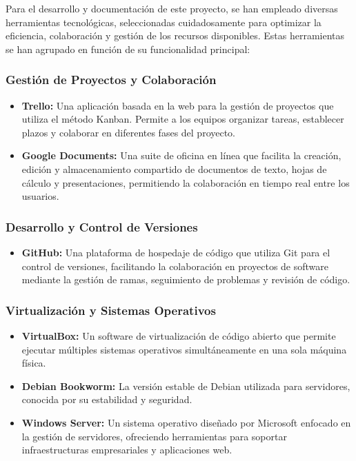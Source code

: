 
Para el desarrollo y documentación de este proyecto, se han empleado diversas herramientas tecnológicas, seleccionadas cuidadosamente para optimizar la eficiencia, colaboración y gestión de los recursos disponibles. Estas herramientas se han agrupado en función de su funcionalidad principal:

\subsubsection{Gestión de Proyectos y Colaboración}
\begin{itemize}
    \item \textbf{Trello:} Una aplicación basada en la web para la gestión de proyectos que utiliza el método Kanban. Permite a los equipos organizar tareas, establecer plazos y colaborar en diferentes fases del proyecto.
    \item \textbf{Google Documents:} Una suite de oficina en línea que facilita la creación, edición y almacenamiento compartido de documentos de texto, hojas de cálculo y presentaciones, permitiendo la colaboración en tiempo real entre los usuarios.
\end{itemize}

\subsubsection{Desarrollo y Control de Versiones}
\begin{itemize}
    \item \textbf{GitHub:} Una plataforma de hospedaje de código que utiliza Git para el control de versiones, facilitando la colaboración en proyectos de software mediante la gestión de ramas, seguimiento de problemas y revisión de código.
\end{itemize}

\subsubsection{Virtualización y Sistemas Operativos}
\begin{itemize}
    \item \textbf{VirtualBox:} Un software de virtualización de código abierto que permite ejecutar múltiples sistemas operativos simultáneamente en una sola máquina física.
    \item \textbf{Debian Bookworm:} La versión estable de Debian utilizada para servidores, conocida por su estabilidad y seguridad.
    \item \textbf{Windows Server:} Un sistema operativo diseñado por Microsoft enfocado en la gestión de servidores, ofreciendo herramientas para soportar infraestructuras empresariales y aplicaciones web.
\end{itemize}

